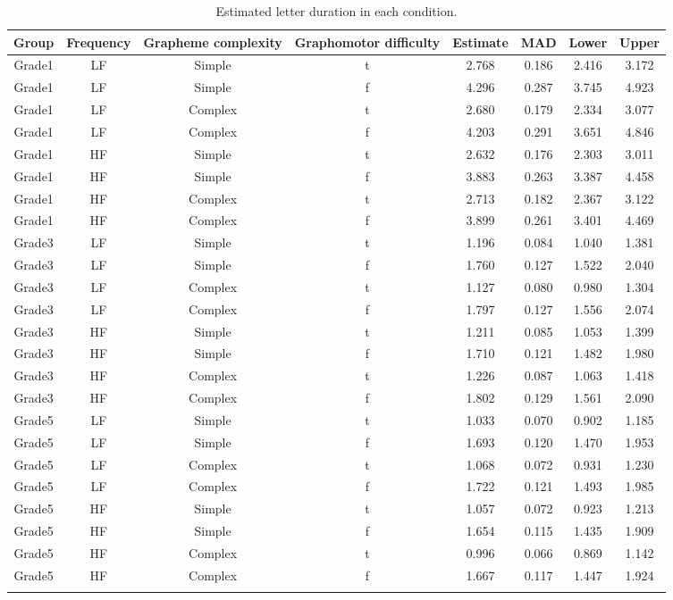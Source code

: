 \documentclass[
  11pt,
  english,
  ,doc,mask,floatsintext]{apa6}
\begin{document}
\begin{table}[htb]

\begin{center}
\begin{threeparttable}

\caption{\label{tab:duration-predictions-summary}Estimated letter duration in each condition.}

\scriptsize{

\begin{tabular}{cccccccc}
\toprule
Group & \multicolumn{1}{c}{Frequency} & \multicolumn{1}{c}{Grapheme complexity} & \multicolumn{1}{c}{Graphomotor difficulty} & \multicolumn{1}{c}{Estimate} & \multicolumn{1}{c}{MAD} & \multicolumn{1}{c}{Lower} & \multicolumn{1}{c}{Upper}\\
\midrule
Grade1 & LF & Simple & t & 2.768 & 0.186 & 2.416 & 3.172\\
Grade1 & LF & Simple & f & 4.296 & 0.287 & 3.745 & 4.923\\
Grade1 & LF & Complex & t & 2.680 & 0.179 & 2.334 & 3.077\\
Grade1 & LF & Complex & f & 4.203 & 0.291 & 3.651 & 4.846\\
Grade1 & HF & Simple & t & 2.632 & 0.176 & 2.303 & 3.011\\
Grade1 & HF & Simple & f & 3.883 & 0.263 & 3.387 & 4.458\\
Grade1 & HF & Complex & t & 2.713 & 0.182 & 2.367 & 3.122\\
Grade1 & HF & Complex & f & 3.899 & 0.261 & 3.401 & 4.469\\
Grade3 & LF & Simple & t & 1.196 & 0.084 & 1.040 & 1.381\\
Grade3 & LF & Simple & f & 1.760 & 0.127 & 1.522 & 2.040\\
Grade3 & LF & Complex & t & 1.127 & 0.080 & 0.980 & 1.304\\
Grade3 & LF & Complex & f & 1.797 & 0.127 & 1.556 & 2.074\\
Grade3 & HF & Simple & t & 1.211 & 0.085 & 1.053 & 1.399\\
Grade3 & HF & Simple & f & 1.710 & 0.121 & 1.482 & 1.980\\
Grade3 & HF & Complex & t & 1.226 & 0.087 & 1.063 & 1.418\\
Grade3 & HF & Complex & f & 1.802 & 0.129 & 1.561 & 2.090\\
Grade5 & LF & Simple & t & 1.033 & 0.070 & 0.902 & 1.185\\
Grade5 & LF & Simple & f & 1.693 & 0.120 & 1.470 & 1.953\\
Grade5 & LF & Complex & t & 1.068 & 0.072 & 0.931 & 1.230\\
Grade5 & LF & Complex & f & 1.722 & 0.121 & 1.493 & 1.985\\
Grade5 & HF & Simple & t & 1.057 & 0.072 & 0.923 & 1.213\\
Grade5 & HF & Simple & f & 1.654 & 0.115 & 1.435 & 1.909\\
Grade5 & HF & Complex & t & 0.996 & 0.066 & 0.869 & 1.142\\
Grade5 & HF & Complex & f & 1.667 & 0.117 & 1.447 & 1.924\\
\bottomrule
\addlinespace
\end{tabular}

}
\end{threeparttable}
\end{center}
\end{table}
\end{document}
